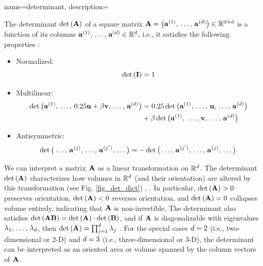 {name={determinant},
	description={The determinant $\det\,({\bf A})$ of a square \gls{matrix} 
		$\mA =\linebreak \big( \va^{(1)},\,\ldots,\,\va^{(\nrfeatures)} \big) \in \mathbb{R}^{\nrfeatures \times \nrfeatures}$ is a 
		\gls{function} of its columns ${\bf a}^{(1)},\,\ldots,\,{\bf a}^{(d)} \in \mathbb{R}^{d}$, i.e., it satisfies 
		the following properties \cite{DirschmidHansJorg1996TuF}:
		\begin{itemize}
			\item Normalized: $$\det\,(\mathbf{I}) = 1$$ 
			\item Multilinear: \begin{align} \nonumber \det \big({\bf a}^{(1)},\,\ldots,\,0.25{\bf u}+ \beta {\bf v},\,\ldots,\,{\bf a}^{(d)} \big) & = 0.25\det \big({\bf a}^{(1)},\,\ldots,\,{\bf u},\,\ldots,\,{\bf a}^{(d)} \big) \\ 
			& +\beta\det \big({\bf a}^{(1)},\,\ldots,\,{\bf v},\,\ldots,\,{\bf a}^{(d)} \big) \nonumber
			\end{align}
			\item Antisymmetric: $$\det \big(\ldots,\,{\bf a}^{(j)}, \,\ldots, \,{\bf a}^{(j')},\,\ldots \big) = - \det \big(\ldots,\,{\bf a}^{(j')}, \,\ldots, \,{\bf a}^{(j)},\,\ldots \big).$$ 
		\end{itemize} 
		We can interpret a \gls{matrix} ${\bf A}$ as a linear transformation on $\mathbb{R}^{d}$.
		The determinant $\det\,({\bf A})$ characterizes how volumes in $\mathbb{R}^d$ (and their orientation) 
		are altered by this transformation (see Fig. \ref{fig_det_dict}) \cite{GolubVanLoanBook}, \cite{Strang2007}. 
 		In particular, $\det\,({\bf A}) > 0$ preserves orientation, $\det\,({\bf A}) < 0$ reverses orientation, 
 		and $\det\,({\bf A}) = 0$ collapses volume entirely, indicating that ${\bf A}$ is non-invertible. 
 		The determinant also satisfies $\det\,({\bf A} {\bf B}) = \det\,({\bf A}) \cdot \det\,({\bf B})$, and if ${\bf A}$ is 
 		diagonalizable with \glspl{eigenvalue} $\lambda_{1}, \,\ldots, \,\lambda_{d}$, then 
		$\det\,({\bf A}) = \prod_{j=1}^{d} \lambda_{j}$ \cite{HornMatAnalysis}.
    		For the special cases $d=2$ (i.e., two-dimensional or 2-D) and $d=3$ (i.e., three-dimensional or 3-D), 
		the determinant can be interpreted as an oriented area or volume spanned by the column \glspl{vector} of ${\bf A}$.
    		\begin{figure}[H]
    			\begin{center}

\end{center}
\end{figure}}}
